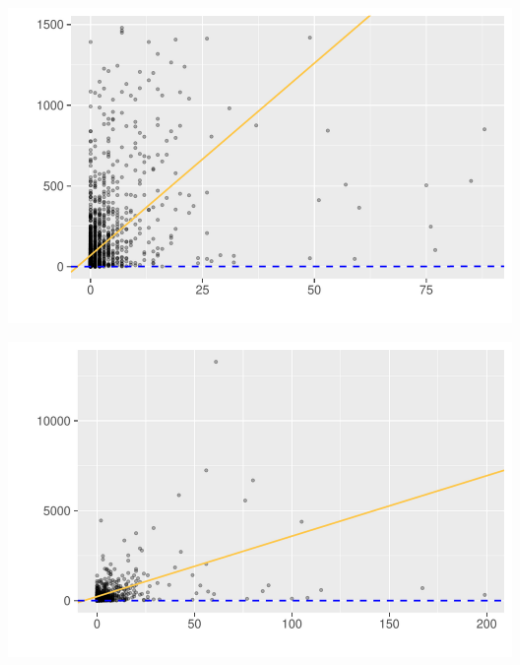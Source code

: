 \vspace{20 pt}

\begin{minipage}{.5\textwidth}
	\centering
	\includegraphics[page=1,scale=0.3]{../hypotheses/lm_issues_model_1_2.pdf}
  \label{fig:hyp1_issue_model_1-2}
\end{minipage}
\begin{minipage}{.5\textwidth}
	\centering
	\includegraphics[page=1,scale=0.3]{../hypotheses/lm_issues_model_3_4.pdf}
  \label{fig:hyp1_issue_model_3-4}
\end{minipage}

\vspace{20 pt}

